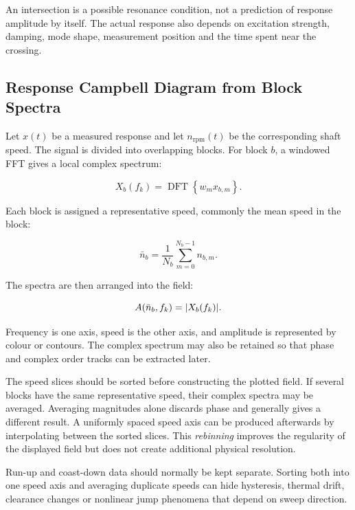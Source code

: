 An intersection is a possible resonance condition, not a prediction of response
amplitude by itself. The actual response also depends on excitation strength,
damping, mode shape, measurement position and the time spent near the crossing.

\subsection{Response Campbell Diagram from Block Spectra}

Let $ x(t) $ be a measured response and let $ n_{\mathrm{rpm}}(t) $ be the
corresponding shaft speed. The signal is divided into overlapping blocks. For
block $ b $, a windowed FFT gives a local complex spectrum:

\begin{equation}
    X_b(f_k)
    = \operatorname{DFT}\left\{w_m x_{b,m}\right\}.
\end{equation}

Each block is assigned a representative speed, commonly the mean speed in the
block:

\begin{equation}\label{campbell-block-speed}
    \bar n_b
    = \frac{1}{N_b}\sum_{m=0}^{N_b-1}n_{b,m}.
\end{equation}

The spectra are then arranged into the field:

\begin{equation}\label{campbell-field-definition}
    A(\bar n_b,f_k)=| {X_b(f_k)} |.
\end{equation}

Frequency is one axis, speed is the other axis, and amplitude is represented by
colour or contours. The complex spectrum may also be retained so that phase and
complex order tracks can be extracted later.

The speed slices should be sorted before constructing the plotted field. If
several blocks have the same representative speed, their complex spectra may be
averaged. Averaging magnitudes alone discards phase and generally gives a
different result. A uniformly spaced speed axis can be produced afterwards by
interpolating between the sorted slices. This \textit{rebinning} improves the
regularity of the displayed field but does not create additional physical
resolution.

Run-up and coast-down data should normally be kept separate. Sorting both into
one speed axis and averaging duplicate speeds can hide hysteresis, thermal drift,
clearance changes or nonlinear jump phenomena that depend on sweep direction.


